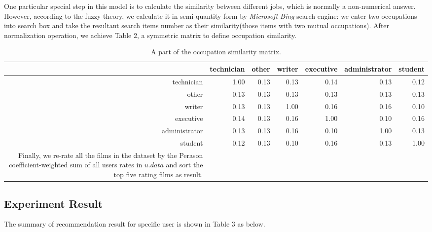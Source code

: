 One particular special step in this model is to calculate the similarity between different jobs, which is normally a non-numerical answer. However, according to the fuzzy theory, we calculate it in semi-quantity form by \textit{Microsoft Bing} search engine: we enter two occupations into search box and take the resultant search items number as their similarity(those items with two mutual occupations). After normalization operation, we achieve Table 2, a symmetric matrix to define occupation similarity.

\begin{longtable}{|r|r|r|r|r|r|r|}
\hline
           & technician &      other &     writer &  executive & administrator &    student \\
\hline
technician &      1.00  &      0.13  &      0.13  &      0.14  &      0.13  &      0.12  \\
\hline
     other &      0.13  &      0.13  &      0.13  &      0.13  &      0.13  &      0.13  \\
\hline
    writer &      0.13  &      0.13  &      1.00  &      0.16  &      0.16  &      0.10  \\
\hline
 executive &      0.14  &      0.13  &      0.16  &      1.00  &      0.10  &      0.16  \\
\hline
administrator &      0.13  &      0.13  &      0.16  &      0.10  &      1.00  &      0.13  \\
\hline
   student &      0.12  &      0.13  &      0.10  &      0.16  &      0.13  &      1.00  \\
\hline
\caption{A part of the occupation similarity matrix.}
Finally, we re-rate all the films in the dataset by the Perason coefficient-weighted sum of all users rates in $u.data$ and sort the top five rating films as result.

\end{longtable}  


\subsection{Experiment Result}
The summary of recommendation result for specific user is shown in Table 3 as below.

